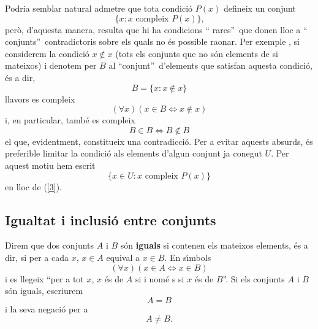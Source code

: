 \begin{observacio}
Podria semblar natural admetre que tota condici\'{o} $P(x)$ defineix un
conjunt%
\begin{equation}
\{x:x\text{ compleix }P(x)\}\text{,}   \label{3}
\end{equation}
per\`{o}, d'aquesta manera, resulta que hi ha condicions \textquotedblleft
rares\textquotedblright\ que donen lloc a \textquotedblleft
conjunts\textquotedblright\ contradictoris sobre els quals no \'{e}s
possible raonar. Per exemple , si considerem la condici\'{o} $x\notin x$
(tots els conjunts que no s\'{o}n elements de si mateixos) i denotem per $B$
al \textquotedblleft conjunt\textquotedblright\ d'elements que satisfan
aquesta condici\'{o}, \'{e}s a dir,%
\begin{equation*}
B=\{x:x\notin x\}
\end{equation*}
llavors es compleix%
\begin{equation*}
\left( \forall x\right) (x\in B\Longleftrightarrow x\notin x)
\end{equation*}
i, en particular, tamb\'{e} es compleix%
\begin{equation*}
B\in B\Longleftrightarrow B\notin B
\end{equation*}
el que, evidentment, constitueix una contradicci\'{o}. Per a evitar aquests
absurds, \'{e}s preferible limitar la condici\'{o} als elements d'algun
conjunt ja conegut $U$. Per aquest motiu hem escrit%
\begin{equation*}
\{x\in U:x\text{ compleix }P(x)\text{\}}
\end{equation*}
en lloc de (\ref{3}).
\end{observacio}

\subsection{Igualtat i inclusi\'{o} entre conjunts}

Direm que dos conjunts $A$ i $B$ s\'{o}n \textbf{iguals} si contenen els
mateixos elements, \'{e}s a dir, si per a cada $x$, $x\in A$ equival a $x\in
B$. En s\'{\i}mbols
\begin{equation*}
\left( \forall x\right) \left( x\in A\Longleftrightarrow x\in B\right)
\end{equation*}
i es llegeix \textquotedblleft per a tot $x$, $x$ \'{e}s de $A$ si i nom\'{e}%
s si $x$ \'{e}s de $B$\textquotedblright. Si els conjunts $A$ i $B$ s\'{o}n
iguals, escriurem%
\begin{equation*}
A=B
\end{equation*}
i la seva negaci\'{o} per a%
\begin{equation*}
A\neq B\text{.}
\end{equation*}

